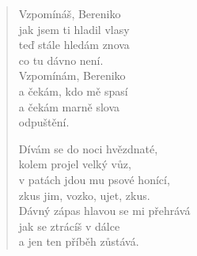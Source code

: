 \begin{multicols}{2}
\begin{verse}
Vzpomínáš, Bereniko\\
jak jsem ti hladil vlasy\\
teď stále hledám znova\\
co tu dávno není.\\
Vzpomínám, Bereniko\\
a čekám, kdo mě spasí\\
a čekám marně slova\\
odpuštění.

Dívám se do noci hvězdnaté,\\
kolem projel velký vůz,\\
v patách jdou mu psové honící,\\
zkus jim, vozko, ujet, zkus.\\
Dávný zápas hlavou se mi přehrává\\
jak se ztrácíš v dálce\\
a jen ten příběh zůstává.

\end{verse}
\end{multicols}
